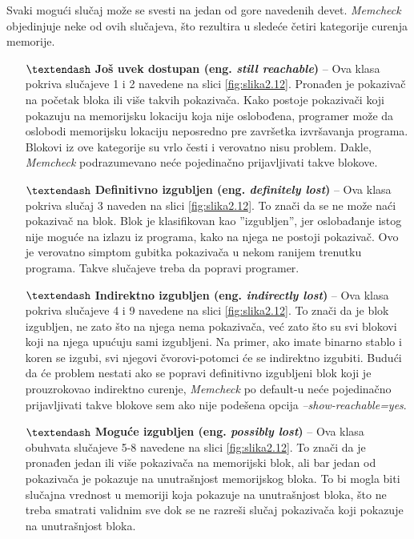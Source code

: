 \documentclass[12pt,oneside]{memoir}
\theoremstyle{plain}
\theoremstyle{definition}
\begin{document}
Svaki mogući slučaj može se svesti na jedan od gore navedenih devet. \textit{Memcheck} objedinjuje neke od ovih slučajeva, što rezultira u sledeće četiri kategorije curenja memorije.
\begin{itemize}
\item[$\textendash$] \textbf{Još uvek dostupan (eng. \textit{still reachable})} – Ova klasa pokriva slučajeve 1 i 2 navedene na slici \ref{fig:slika2.12}. Pronađen je pokazivač na početak bloka ili više takvih pokazivača. Kako postoje pokazivači koji pokazuju na memorijsku lokaciju koja nije oslobođena, programer može da oslobodi memorijsku lokaciju neposredno pre završetka izvršavanja programa. Blokovi iz ove kategorije su vrlo česti i verovatno nisu problem. Dakle, \textit{Memcheck} podrazumevano neće pojedinačno prijavljivati takve blokove.
\item[$\textendash$] \textbf{Definitivno izgubljen (eng. \textit{definitely lost})} – Ova klasa pokriva slučaj 3 naveden na slici \ref{fig:slika2.12}. To znači da se ne može naći pokazivač na blok. Blok je klasifikovan kao ''izgubljen'', jer oslobađanje istog nije moguće na izlazu iz programa, kako na njega ne postoji pokazivač. Ovo je verovatno simptom gubitka pokazivača u nekom ranijem trenutku programa. Takve slučajeve treba da popravi programer.
\item[$\textendash$] \textbf{Indirektno izgubljen (eng. \textit{indirectly lost})} – Ova klasa pokriva slučajeve 4 i 9 navedene na slici \ref{fig:slika2.12}. To znači da je blok izgubljen, ne zato što na njega nema pokazivača, već zato što su svi blokovi koji na njega upućuju sami izgubljeni. Na primer, ako imate binarno stablo i koren se izgubi, svi njegovi čvorovi-potomci će se indirektno izgubiti. Budući da će problem nestati ako se popravi definitivno izgubljeni blok koji je prouzrokovao indirektno curenje, \textit{Memcheck} po default-u neće pojedinačno prijavljivati takve blokove sem ako nije podešena opcija \textit{–show-reachable=yes}.
\item[$\textendash$] \textbf{Moguće izgubljen (eng. \textit{possibly lost})} – Ova klasa obuhvata slučajeve 5-8 navedene na slici \ref{fig:slika2.12}. To znači da je pronađen jedan ili više pokazivača na memorijski blok, ali bar jedan od pokazivača je pokazuje na unutrašnjost memorijskog bloka. To bi mogla biti  slučajna vrednost u memoriji koja pokazuje na unutrašnjost bloka, što ne treba smatrati validnim sve dok se ne razreši slučaj pokazivača koji pokazuje na unutrašnjost bloka.
\end{itemize}
\end{document}
